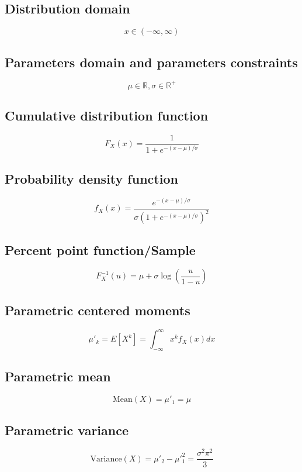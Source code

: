 \documentclass{article}
\begin{document}
\subsection{Distribution domain}
\begin{equation*} x\in\left(-\infty,\infty\right) \end{equation*}
\subsection{Parameters domain and parameters constraints}
\begin{equation*} \mu\in\mathbb{R}, \sigma\in\mathbb{R}^{+} \end{equation*}
\subsection{Cumulative distribution function}
\begin{equation*} F_{X}\left(x\right)=\frac{1}{1+e^{-(x-\mu)/\sigma}} \end{equation*}
\subsection{Probability density function}
\begin{equation*} f_{X}\left(x\right)=\frac{e^{-(x-\mu)/\sigma}} {\sigma\left(1+e^{-(x-\mu)/\sigma}\right)^2} \end{equation*}
\subsection{Percent point function/Sample}
\begin{equation*} F^{-1}_{X}\left(u\right)=\mu+\sigma \log\left(\frac{u}{1-u}\right) \end{equation*}
\subsection{Parametric centered moments}
\begin{equation*} \mu'_{k}=E[X^k]=\int_{-\infty }^{\infty }x^{k}f_{X}\left(x\right)dx \end{equation*}
\subsection{Parametric mean}
\begin{equation*} \mathrm{Mean}(X)=\mu'_{1}=\mu \end{equation*}
\subsection{Parametric variance}
\begin{equation*} \mathrm{Variance}(X)=\mu'_{2}-\mu'^{2}_{1}=\frac{\sigma^2 \pi^2}{3} \end{equation*}
\end{document}
